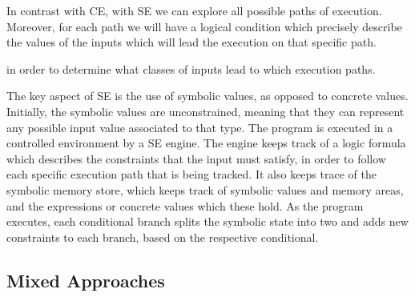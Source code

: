 

In contrast with \gls{CE}, with \gls{SE} we can explore all possible paths of execution. Moreover, for each path we will have a logical condition which precisely describe the values of the inputs which will lead the execution on that specific path.

in order to determine what classes of inputs lead to which execution paths.

The key aspect of \gls{SE} is the use of symbolic values, as opposed to concrete values. Initially, the symbolic values are unconstrained, meaning that they can represent any possible input value associated to that type. The program is executed in a controlled environment by a \gls{SE} engine. The engine keeps track of a logic formula which describes the constraints that the input must satisfy, in order to follow each specific execution path that is being tracked. It also keeps trace of the symbolic memory store, which keeps track of symbolic values and memory areas, and the expressions or concrete values which these hold. As the program executes, each conditional branch splits the symbolic state into two and adds new constraints to each branch, based on the respective conditional.

\subsection{Mixed Approaches}





